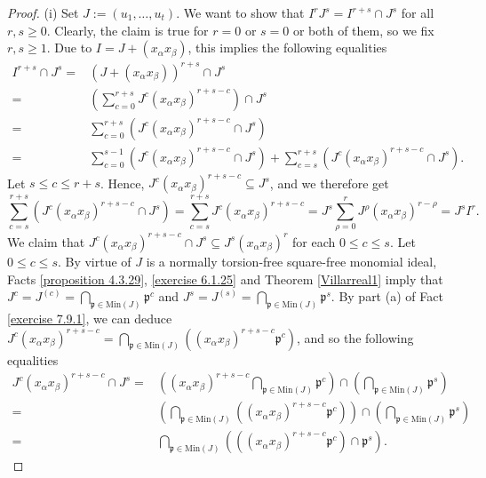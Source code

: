 \documentclass[11pt]{amsart}
\begin{document}
 \begin{proof}
(i)  Set  $J:=(u_1, \ldots, u_t)$.  We want to show that  $I^rJ^s=I^{r+s} \cap J^s$ for all $r,s \geq 0$. 
 Clearly,  the  claim is true for $r=0$ or    $s=0$ or both of them, so we fix  $r,s \geq 1$.   Due to  $I=J+(x_\alpha x_\beta)$, this implies  the following equalities
  \begin{align*}
  I^{r+s}\cap J^s=& (J+ (x_\alpha x_\beta))^{r+s} \cap J^s\\
  =& (\sum_{c=0}^{r+s} J^{c}(x_\alpha x_\beta)^{r+s-c}) \cap J^s\\
  =& \sum_{c=0}^{r+s} (J^{c}(x_\alpha x_\beta)^{r+s-c} \cap J^s)\\
  =& \sum_{c=0}^{s-1} (J^{c}(x_\alpha x_\beta)^{r+s-c} \cap J^s) +
   \sum_{c=s}^{r+s} (J^{c} (x_\alpha x_\beta)^{r+s-c} \cap J^s).
  \end{align*}
  Let $s\leq c \leq r+s$. Hence,  $J^{c} (x_\alpha x_\beta)^{r+s-c}  \subseteq J^s$, and we therefore get  
  $$\sum_{c=s}^{r+s} (J^{c} (x_\alpha x_\beta)^{r+s-c} \cap J^s)= \sum_{c=s}^{r+s} J^{c} (x_\alpha x_\beta)^{r+s-c} 
   =J^s \sum_{\rho=0}^{r} J^{\rho} (x_\alpha x_\beta)^{r- \rho}= J^sI^r.$$
    We claim that    $J^{c} (x_\alpha x_\beta)^{r+s-c} \cap J^s \subseteq J^s  (x_\alpha x_\beta)^{r}$ for each  $0\leq c \leq s$. 
  Let $0 \leq c \leq s$. By virtue of   $J$ is a normally torsion-free square-free monomial ideal,  
  Facts \ref{proposition 4.3.29}, \ref{exercise 6.1.25} and Theorem \ref{Villarreal1} imply that
   $J^c = J^{(c)}= \bigcap_{\mathfrak{p}\in \mathrm{Min}(J)} \mathfrak{p}^{c}$   and  $J^s = J^{(s)}= \bigcap_{\mathfrak{p}\in \mathrm{Min}(J)} \mathfrak{p}^{s}$. By  part (a) of Fact \ref{exercise 7.9.1}, we can deduce $ J^c (x_\alpha x_\beta)^{r+s-c}= \bigcap_{\mathfrak{p}\in \mathrm{Min}(J)}((x_\alpha x_\beta)^{r+s-c}  \mathfrak{p}^{c})$, and so  the following equalities
  \begin{align*}
   J^{c}(x_\alpha x_\beta)^{r+s-c} \cap J^s =&    \left((x_\alpha x_\beta)^{r+s-c} \bigcap_{\mathfrak{p}\in \mathrm{Min}(J)} \mathfrak{p}^{c}\right) \cap 
     \left(\bigcap_{\mathfrak{p}\in \mathrm{Min}(J)} \mathfrak{p}^{s}\right)\\
  =& \left(\bigcap_{\mathfrak{p}\in \mathrm{Min}(J)}((x_\alpha x_\beta)^{r+s-c}  \mathfrak{p}^{c})\right) \cap 
  \left(\bigcap_{\mathfrak{p}\in \mathrm{Min}(J)} \mathfrak{p}^{s}\right)\\
  =& \bigcap_{\mathfrak{p}\in \mathrm{Min}(J)}\left(((x_\alpha x_\beta)^{r+s-c}  \mathfrak{p}^{c}) \cap 
   \mathfrak{p}^{s}\right).
  \end{align*}

\end{proof}
\end{document}
